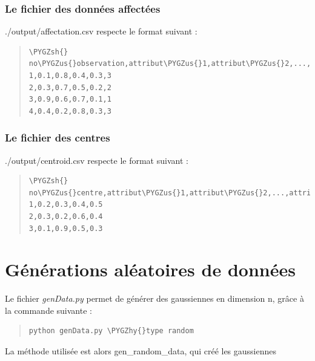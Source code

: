 \documentclass[letterpaper,10pt,english]{sphinxmanual}
\def\PYGZus{\char`\_}
\def\PYGZsh{\char`\#}
\def\PYGZhy{\char`\-}
\begin{document}
\subsubsection{Le fichier des données affectées}
\label{data:le-fichier-des-donnees-affectees}
./output/affectation.csv respecte le format suivant :
\begin{quote}

\begin{Verbatim}[commandchars=\\\{\}]
\PYGZsh{} no\PYGZus{}observation,attribut\PYGZus{}1,attribut\PYGZus{}2,...,attribut\PYGZus{}p,no\PYGZus{}classe
1,0.1,0.8,0.4,0.3,3
2,0.3,0.7,0.5,0.2,2
3,0.9,0.6,0.7,0.1,1
4,0.4,0.2,0.8,0.3,3
\end{Verbatim}
\end{quote}


\subsubsection{Le fichier des centres}
\label{data:le-fichier-des-centres}
./output/centroid.csv respecte le format suivant :
\begin{quote}

\begin{Verbatim}[commandchars=\\\{\}]
\PYGZsh{} no\PYGZus{}centre,attribut\PYGZus{}1,attribut\PYGZus{}2,...,attribut\PYGZus{}p
1,0.2,0.3,0.4,0.5
2,0.3,0.2,0.6,0.4
3,0.1,0.9,0.5,0.3
\end{Verbatim}
\end{quote}


\section{Générations aléatoires de données}
\label{nD:generations-aleatoires-de-donnees}\label{nD:random}\label{nD::doc}
Le fichier \emph{genData.py} permet de générer des gaussiennes en dimension n, grâce à la commande suivante :
\begin{quote}

\begin{Verbatim}[commandchars=\\\{\}]
python genData.py \PYGZhy{}type random
\end{Verbatim}
\end{quote}

La méthode utilisée est alors gen\_random\_data, qui créé les gaussiennes
\end{document}
